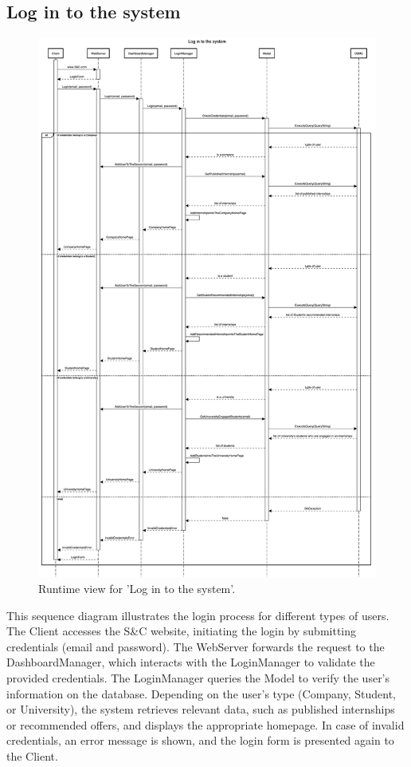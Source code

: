 \subsection{Log in to the system}
\begin{figure}[H]
    \begin{center}
        \includegraphics[width=0.75\linewidth]{DD/LaTeX/Images/RuntimeView/LogIn.png}
        \caption{Runtime view for 'Log in to the system'.}
        \label{fig:runtime_LogIn}%
    \end{center}
\end{figure}

This sequence diagram illustrates the login process for different types of users. The Client accesses the S\&C website, initiating the login by submitting credentials (email and password). The WebServer forwards the request to the DashboardManager, which interacts with the LoginManager to validate the provided credentials. The LoginManager queries the Model to verify the user's information on the database. Depending on the user's type (Company, Student, or University), the system retrieves relevant data, such as published internships or recommended offers, and displays the appropriate homepage. In case of invalid credentials, an error message is shown, and the login form is presented again to the Client.

